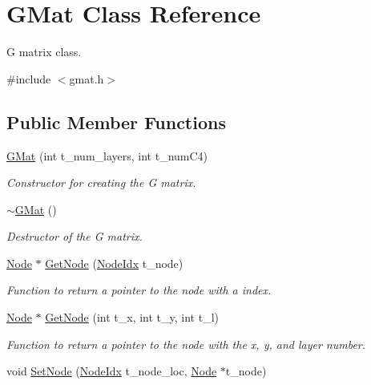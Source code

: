 \hypertarget{classGMat}{}\section{G\+Mat Class Reference}
\label{classGMat}


G matrix class.  




{\ttfamily \#include $<$gmat.\+h$>$}

\subsection*{Public Member Functions}
\begin{DoxyCompactItemize}
\item 
\hyperlink{classGMat_ad89367522ad38208488689b4146b6bbc}{G\+Mat} (int t\+\_\+num\+\_\+layers, int t\+\_\+num\+C4)
\begin{DoxyCompactList}\small\item\em Constructor for creating the G matrix. \end{DoxyCompactList}\item 
\hyperlink{classGMat_aeb2bc57952d6046f91afac0bcb3a7243}{$\sim$\+G\+Mat} ()
\begin{DoxyCompactList}\small\item\em Destructor of the G matrix. \end{DoxyCompactList}\item 
\hyperlink{classNode}{Node} $\ast$ \hyperlink{classGMat_a48cc4288be2ae357591bab12339e0114}{Get\+Node} (\hyperlink{node_8h_a5b622fe4354316a2f349615d150ae998}{Node\+Idx} t\+\_\+node)
\begin{DoxyCompactList}\small\item\em Function to return a pointer to the node with a index. \end{DoxyCompactList}\item 
\hyperlink{classNode}{Node} $\ast$ \hyperlink{classGMat_a54844be32da6280169a0f8ee08283d5a}{Get\+Node} (int t\+\_\+x, int t\+\_\+y, int t\+\_\+l)
\begin{DoxyCompactList}\small\item\em Function to return a pointer to the node with the x, y, and layer number. \end{DoxyCompactList}\item 
void \hyperlink{classGMat_a96d512b19a257d2361eac59dacee218d}{Set\+Node} (\hyperlink{node_8h_a5b622fe4354316a2f349615d150ae998}{Node\+Idx} t\+\_\+node\+\_\+loc, \hyperlink{classNode}{Node} $\ast$t\+\_\+node)

\end{DoxyCompactItemize}
